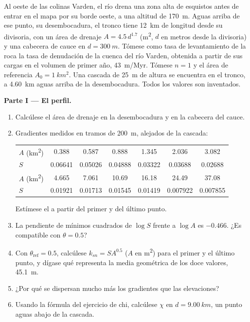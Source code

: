 \begin{problem}
\label{pb:b3:quantitative-geomorphology:1}
Al oeste de las colinas Varden, el río drena una zona alta de esquistos antes de
entrar en el mapa por su borde oeste, a una altitud de \qty{170}{m}. Aguas arriba de ese punto,
su desembocadura, el tronco tiene \qty{12}{km} de longitud desde su divisoria,
con un área de drenaje $A = 4.5\,d^{1.7}$ (\unit{m^2}, $d$ en metros desde la
divisoria) y una cabecera de cauce en $d = \qty{300}{m}$. Tómese como tasa de levantamiento de la roca
la tasa de denudación de la cuenca del río Varden, obtenida a partir de sus cargas
en el volumen de primer año, \qty{43}{m/Myr}. Tómese $n = 1$ y el área de referencia $A_0 = \qty{1}{km^2}$.
Una cascada de \qty{25}{m} de altura se encuentra en el tronco, a \qty{4.60}{km} aguas arriba de
la desembocadura. Todos los valores son inventados.

\medskip\noindent\textbf{Parte I --- El perfil.}
\begin{enumerate}
\item Calcúlese el área de drenaje en la desembocadura y en la cabecera del cauce.
\item Gradientes medidos en tramos de \qty{200}{m}, alejados de la
  cascada:

  \smallskip
  {\small\begin{tabular}{l*{6}{c}}
  $A$ (\unit{km^2}) & 0.388 & 0.587 & 0.888 & 1.345 & 2.036 & 3.082 \\
  $S$ & 0.06641 & 0.05026 & 0.04888 & 0.03322 & 0.03688 & 0.02688 \\[2pt]
  $A$ (\unit{km^2}) & 4.665 & 7.061 & 10.69 & 16.18 & 24.49 & 37.08 \\
  $S$ & 0.01921 & 0.01713 & 0.01545 & 0.01419 & 0.007922 & 0.007855
  \end{tabular}}

  \smallskip
  Estímese el  a partir del primer y del último punto.
\item La pendiente de mínimos cuadrados de $\log S$ frente a $\log A$ es $-0.466$.
  ¿Es compatible con $\theta = 0.5$?
\item Con $\theta_{\mathrm{ref}} = 0.5$, calcúlese $k_{sn} = S A^{0.5}$ ($A$ en
  \unit{m^2}) para el primer y el último punto, y dígase qué representa la media
  geométrica de los doce valores, \qty{45.1}{m}.
\item ¿Por qué se dispersan mucho más los gradientes que las elevaciones?
\item Usando la fórmula del ejercicio de chi, calcúlese $\chi$ en $d =
  \qty{9.00}{km}$, un punto aguas abajo de la cascada.
\end{enumerate}


\end{problem}
